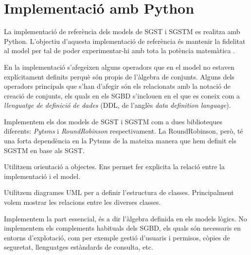 

\chapter{Implementació amb Python}


La implementació de referència dels models de SGST i SGSTM es realitza
amb Python. L'objectiu d'aquesta implementació de
referència és mantenir la fidelitat al model per tal de poder
experimentar-hi amb tota la potència matemàtica .

En la implementació s'afegeixen alguns operadors que en el model no
estaven explícitament definits perquè són propis de l'àlgebra de
conjunts. Alguns dels operadors principals que s'han d'afegir són els
relacionats amb la notació de creació de
conjunts, %
els quals en els SGBD s'inclouen en el que es coneix com a
\emph{llenguatge de definició de dades} (DDL, de l'anglès \emph{data
  definition language}).





Implementem els dos models de SGST i SGSTM com a dues biblioteques
diferents: \emph{Pytsms} i \emph{RoundRobinson} respectivament. La
RoundRobinson, però, té una forta dependència en la
Pytsms de la mateixa manera que hem definit els SGSTM en base
als SGST.


Utilitzem orientació a objectes. Ens permet fer explicita la relació
entre la implementació i el model. 

Utilitzem diagrames UML per a definir l'estructura de classes. Principalment volem mostrar les relacions entre les diverses classes.


Implementem la part essencial, és a dir l'àlgebra definida en els
models lògics. No implementem els complements habituals dels SGBD, els
quals són necessaris en entorns d'explotació, com per exemple gestió
d'usuaris i permisos, còpies de seguretat, llenguatges estàndards de
consulta, etc.




